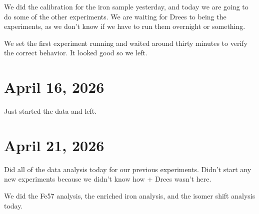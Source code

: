 \documentclass[11pt]{article}
\begin{document}
We did the calibration for the iron sample yesterday,
and today we are going to do some of the other experiments.
We are waiting for Drees to being the experiments, as we don't know
if we have to run them overnight or something.

We set the first experiment running and waited around thirty minutes to
verify the correct behavior. It looked good so we left.

\section{April 16, 2026}

Just started the data and left.

\section{April 21, 2026}

Did all of the data analysis today for our previous experiments. Didn't
start any new experiments because we didn't know how + Drees wasn't here.

We did the Fe57 analysis, the enriched iron analysis, and the isomer shift analysis
today.
\end{document}
